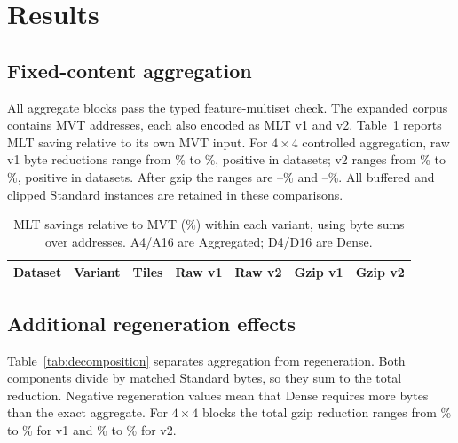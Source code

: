 \section{Results}\label{sec:results}

\subsection{Fixed-content aggregation}\label{sec:results-granularity}
All \ExtAggregateBlocks{} aggregate blocks pass the typed feature-multiset check.
The expanded corpus contains \ExtTiles{} MVT addresses, each also encoded as MLT
v1 and v2. Table~\ref{tab:main} reports MLT saving relative to its own MVT input.
For $4\times4$ controlled aggregation, raw v1 byte reductions range from
\ExtOneRawAggregationMin\% to \ExtOneRawAggregationMax\%, positive in
\ExtOneRawAggregationPositive{} datasets; v2 ranges from \ExtTwoRawAggregationMin\%
to \ExtTwoRawAggregationMax\%, positive in \ExtTwoRawAggregationPositive{} datasets.
After gzip the ranges are \ExtOneGzipAggregationMin--\ExtOneGzipAggregationMax\%
and \ExtTwoGzipAggregationMin--\ExtTwoGzipAggregationMax\%. All buffered and clipped
Standard instances are retained in these comparisons.

\begin{table}[!tp]\centering\small
\caption{MLT savings relative to MVT (\%) within each variant, using byte sums
over addresses. A4/A16 are Aggregated; D4/D16 are Dense.}\label{tab:main}
\begin{tabular}{@{}llrrrrr@{}}\toprule
Dataset & Variant & Tiles & Raw v1 & Raw v2 & Gzip v1 & Gzip v2\\
\midrule\end{tabular}\end{table}


\subsection{Additional regeneration effects}\label{sec:results-density}
Table~\ref{tab:decomposition} separates aggregation from regeneration. Both components
divide by matched Standard bytes, so they sum to the total reduction. Negative
regeneration values mean that Dense requires more bytes than the exact aggregate.
For $4\times4$ blocks the total gzip reduction ranges from
\ExtOneGzipTotalMin\% to \ExtOneGzipTotalMax\% for v1 and
\ExtTwoGzipTotalMin\% to \ExtTwoGzipTotalMax\% for v2.

